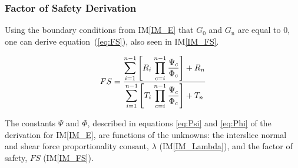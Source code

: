 \documentclass[12pt]{article}
\newcommand{\iref}[1]{IM\ref{#1}}
\begin{document}
\subsubsection*{Factor of Safety Derivation}

\noindent
Using the boundary conditions from \iref{IM_E} that $G_{\text{0}}$ and 
$G_{\text{n}}$ are equal to $0$, one can derive equation~(\ref{eq:FS}),
also seen in \iref{IM_FS}.

\begin{equation}\label{eq:FS}
 {FS}= \frac{\displaystyle\sum_{i=1}^{n-1} \left[ {R_{i}}
 	\;{\displaystyle\prod_{c=i}^{n-1} \frac{\Psi_{c}}{\Phi_{c}}
 	}\right] + {R_{n}} }{\displaystyle\sum_{i=1}^{n-1} \left[ {T_{i}}
 	\;{\displaystyle\prod_{c=i}^{n-1} \frac{\Psi_{c}}{\Phi_{c}}
 	}\right] + {T_{n}} }\\
\end{equation}

\noindent
The constants $\Psi$ and $\Phi$, described in equations \ref{eq:Psi}
and \ref{eq:Phi} of the derivation for \iref{IM_E}, are functions of the 
unknowns: the interslice normal and shear force proportionality consant, 
$\lambda$ 
(\iref{IM_Lambda}), and the factor of safety, $FS$ (\iref{IM_FS}).

~\newline

\end{document}
